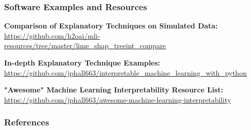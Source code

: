 \documentclass[11pt, 
               aspectratio=169
               ]{beamer}
\begin{document}
		\begin{frame}

			\frametitle{Software Examples and Resources}
			
			\vspace{-30pt}
			
			\textbf{Comparison of Explanatory Techniques on Simulated Data:}\\
			\href{https://github.com/h2oai/mli-resources/tree/master/lime_shap_treeint_compare}{https://github.com/h2oai/mli-resources/tree/master/lime\_shap\_treeint\_compare}\\
			
			\vspace{10pt}
		
			\textbf{In-depth Explanatory Technique Examples:}\\
			\href{https://github.com/jphall663/interpretable_machine_learning_with_python}{
			https://github.com/jphall663/interpretable\_machine\_learning\_with\_python}\\
			
			\vspace{10pt}
			
			\textbf{"Awesome" Machine Learning Interpretability Resource List:}\\
			\href{https://github.com/jphall663/awesome-machine-learning-interpretability}{https://github.com/jphall663/awesome-machine-learning-interpretability}
			
			
			
		\end{frame}



	\begin{frame}[allowframebreaks]
	
		\frametitle{References}
		
		\printbibliography
		
	\end{frame}
\end{document}
